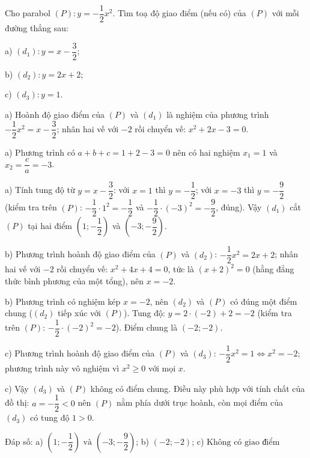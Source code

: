 \begin{problem}[9DS-HSB2-022]
Cho parabol $(P)\colon y = -\dfrac{1}{2}x^2$. Tìm toạ độ giao điểm (nếu có) của $(P)$ với mỗi đường thẳng sau:

a) $(d_1)\colon y = x - \dfrac{3}{2}$;

b) $(d_2)\colon y = 2x + 2$;

c) $(d_3)\colon y = 1$.

\begin{solution}
a) Hoành độ giao điểm của $(P)$ và $(d_1)$ là nghiệm của phương trình $-\dfrac{1}{2}x^2 = x - \dfrac{3}{2}$; nhân hai vế với $-2$ rồi chuyển vế: $x^2 + 2x - 3 = 0$.

a) Phương trình có $a + b + c = 1 + 2 - 3 = 0$ nên có hai nghiệm $x_1 = 1$ và $x_2 = \dfrac{c}{a} = -3$.

a) Tính tung độ từ $y = x - \dfrac{3}{2}$: với $x = 1$ thì $y = -\dfrac{1}{2}$; với $x = -3$ thì $y = -\dfrac{9}{2}$ (kiểm tra trên $(P)$: $-\dfrac{1}{2} \cdot 1^2 = -\dfrac{1}{2}$ và $-\dfrac{1}{2} \cdot (-3)^2 = -\dfrac{9}{2}$, đúng). Vậy $(d_1)$ cắt $(P)$ tại hai điểm $\left(1; -\dfrac{1}{2}\right)$ và $\left(-3; -\dfrac{9}{2}\right)$.

b) Phương trình hoành độ giao điểm của $(P)$ và $(d_2)$: $-\dfrac{1}{2}x^2 = 2x + 2$; nhân hai vế với $-2$ rồi chuyển vế: $x^2 + 4x + 4 = 0$, tức là $(x + 2)^2 = 0$ (hằng đẳng thức bình phương của một tổng), nên $x = -2$.

b) Phương trình có nghiệm kép $x = -2$, nên $(d_2)$ và $(P)$ có đúng một điểm chung ($(d_2)$ tiếp xúc với $(P)$). Tung độ: $y = 2 \cdot (-2) + 2 = -2$ (kiểm tra trên $(P)$: $-\dfrac{1}{2} \cdot (-2)^2 = -2$). Điểm chung là $(-2; -2)$.

c) Phương trình hoành độ giao điểm của $(P)$ và $(d_3)$: $-\dfrac{1}{2}x^2 = 1 \Leftrightarrow x^2 = -2$; phương trình này vô nghiệm vì $x^2 \geq 0$ với mọi $x$.

c) Vậy $(d_3)$ và $(P)$ không có điểm chung. Điều này phù hợp với tính chất của đồ thị: $a = -\dfrac{1}{2} < 0$ nên $(P)$ nằm phía dưới trục hoành, còn mọi điểm của $(d_3)$ có tung độ $1 > 0$.

Đáp số: a) $\boxed{\left(1; -\dfrac{1}{2}\right) \text{ và } \left(-3; -\dfrac{9}{2}\right)}$; b) $\boxed{(-2; -2)}$; c) $\boxed{\text{Không có giao điểm}}$
\end{solution}
\end{problem}

